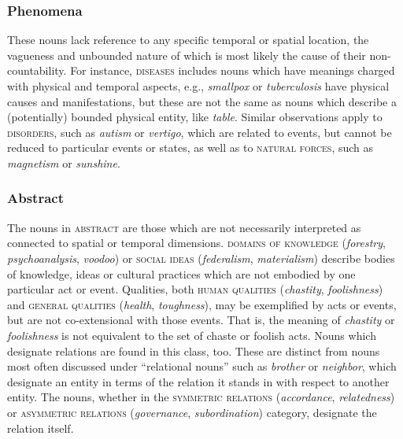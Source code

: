 \documentclass[output=paper]{langscibook}
\begin{document}
\subsubsection{Phenomena} These nouns lack reference to any specific temporal or spatial location, the vagueness and unbounded nature of which is most likely the cause of their non-count\-abil\-ity. For instance, \textsc{diseases} includes nouns which have meanings charged with  physical and temporal aspects, e.g., \textit{smallpox} or \textit{tuberculosis} have physical causes and manifestations, but these are not the same as nouns which describe a (potentially) bounded physical entity, like \textit{table}.   Similar observations apply to  \textsc{disorders}, such as \textit{autism} or \textit{vertigo}, which are related to events, but cannot be reduced to particular events or states, as well as to \textsc{natural forces}, such as \textit{magnetism} or \textit{sunshine}.  









\subsubsection{Abstract} The nouns in \textsc{abstract} are those which are not necessarily interpreted as connected to spatial or temporal dimensions.  \textsc{domains of knowledge} (\textit{forestry}, \textit{psychoanalysis}, \textit{voodoo}) or \textsc{social ideas}  (\textit{federalism}, \textit{materialism}) describe bodies of knowledge, ideas or cultural practices which are not embodied by one particular act or event.  Qualities, both \textsc{human qualities} (\textit{chastity}, \textit{foolishness}) and \textsc{general qualities} (\textit{health}, \textit{toughness}), may be exemplified by acts or events, but are not co-extensional with those events.  That is, the meaning of \textit{chastity} or \textit{foolishness} is not equivalent to the set of chaste or foolish acts.  Nouns which designate relations are found in this class, too.  These are distinct from nouns most often discussed under ``relational nouns'' such as \textit{brother} or \textit{neighbor}, which designate an entity in terms of the relation it stands in with respect to another entity.  The nouns, whether in the \textsc{symmetric relations} (\textit{accordance}, \textit{relatedness}) or \textsc{asymmetric relations} (\textit{governance}, \textit{subordination}) category, designate the relation itself.  
\end{document}
